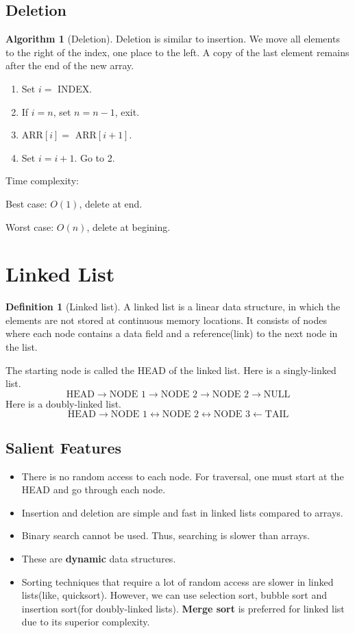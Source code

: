 \documentclass[10pt, a4paper]{extarticle}
\theoremstyle{definition}
\newtheorem{alg}{Algorithm}
\newtheorem{defn}{Definition}
\begin{document}
\subsection{Deletion}
\begin{alg}[Deletion]
	Deletion is similar to insertion. We move all elements to the right of the index, one place to the left. A copy of the last element remains after the end of the new array.
	\begin{enumerate}
		\item Set $i=$ INDEX.
		\item If $i=n$, set $n=n-1$, exit.
		\item ARR$[i]=$ ARR$[i+1]$.
		\item Set $i=i+1$. Go to 2.
	\end{enumerate}
	Time complexity:

	Best case: $O(1)$, delete at end.

	Worst case: $O(n)$, delete at begining.
\end{alg}

\section{Linked List}
\begin{defn}[Linked list]
	A linked list is a linear data structure, in which the elements are not stored at continuous memory locations. It consists of nodes where each node contains a data field and a reference(link) to the next node in the list.

	The starting node is called the HEAD of the linked list. Here is a singly-linked list.
	\[\boxed{\text{HEAD}}\to \boxed{\text{NODE 1}}\to \boxed{\text{NODE 2}}\to \boxed{\text{NODE 2}}\to \boxed{\text{NULL}}\]
	Here is a doubly-linked list.
	\[\boxed{\text{HEAD}}\to\boxed{\text{NODE 1}}\leftrightarrow\boxed{\text{NODE 2}}\leftrightarrow\boxed{\text{NODE 3}}\leftarrow\boxed{\text{TAIL}}\]
\end{defn}
\subsection{Salient Features}
\begin{itemize}
	\item There is no random access to each node. For traversal, one must start at the HEAD and go through each node.
	\item Insertion and deletion are simple and fast in linked lists compared to arrays.
	\item Binary search cannot be used. Thus, searching is slower than arrays.
	\item These are \textbf{dynamic} data structures.
	\item Sorting techniques that require a lot of random access are slower in linked lists(like, quicksort). However, we can use selection sort, bubble sort and insertion sort(for doubly-linked lists). \textbf{Merge sort} is preferred for linked list due to its superior complexity.
\end{itemize}
\end{document}
